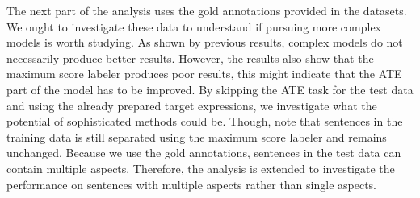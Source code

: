 \documentclass[american, oneside]{ecsgdp}
\begin{document}
\begin{table}[htbp]
\centering
\caption{Performance of various methods on the sentiment classification task on gold annotated data}
\label{tab:sentiment-perf-gold}
\end{table}

The next part of the analysis uses the gold annotations provided in the datasets. We ought to investigate these data to understand if pursuing more complex models is worth studying. As shown by previous results, complex models do not necessarily produce better results. However, the results also show that the maximum score labeler produces poor results, this might indicate that the ATE part of the model has to be improved. By skipping the ATE task for the test data and using the already prepared target expressions, we investigate what the potential of sophisticated methods could be. Though, note that sentences in the training data is still separated using the maximum score labeler and remains unchanged. Because we use the gold annotations, sentences in the test data can contain multiple aspects. Therefore, the analysis is extended to investigate the performance on sentences with multiple aspects rather than single aspects.
\end{document}
